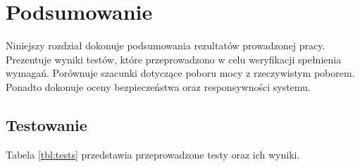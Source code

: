 \chapter{Podsumowanie}
\label{chap:results}

	Niniejszy rozdział dokonuje podsumowania rezultatów prowadzonej pracy. Prezentuje wyniki testów, które przeprowadzono w celu weryfikacji spełnienia wymagań. Porównuje szacunki dotyczące poboru mocy z rzeczywistym poborem. Ponadto dokonuje oceny bezpieczeństwa oraz responsywności systemu.

    \section{Testowanie}

        Tabela \ref{tbl:tests} przedstawia przeprowadzone testy oraz ich wyniki.

